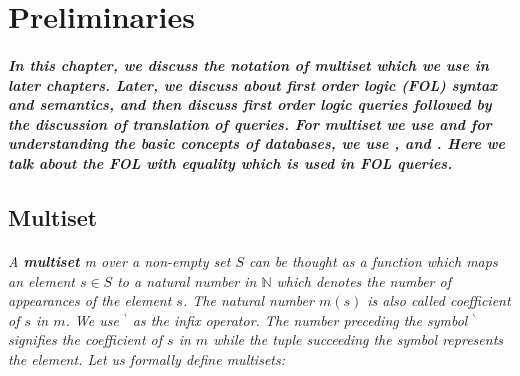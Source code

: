 \chapter{Preliminaries}
\label{ch:preliminaries}

\paragraph*{\textnormal{In this chapter, we discuss the notation of multiset which we use in later chapters. Later, we discuss about first order logic (FOL) syntax and semantics, and then discuss first order logic queries followed by the discussion of translation of queries. For multiset we use \cite{DBLP:books/daglib/CPN_Book} and for understanding the basic concepts of databases, we use \cite{DBLP:books/aw/found_DB}, \cite{Diego_Calvanese_Slides_Database} and \cite{DB_all_lectures}. Here we talk about the FOL with equality which is used in FOL queries.}}

\section{Multiset}
\label{sec:preliminaries_multiset}
\subparagraph*{\textnormal{A \textit{\textbf{multiset} m} over a non-empty set $S$ can be thought as a function which maps an element $s \in S$ to a natural number in $\mathbb{N}$ which denotes the number of appearances of the element $s$. The natural number $m(s)$ is also called coefficient of $s$ in $m$. We use ${}^{\backprime}$ as the infix operator. The number preceding the symbol ${}^{\backprime}$ signifies the coefficient of $s$ in $m$ while the tuple succeeding the symbol represents the element. Let us formally define multisets:
}}

